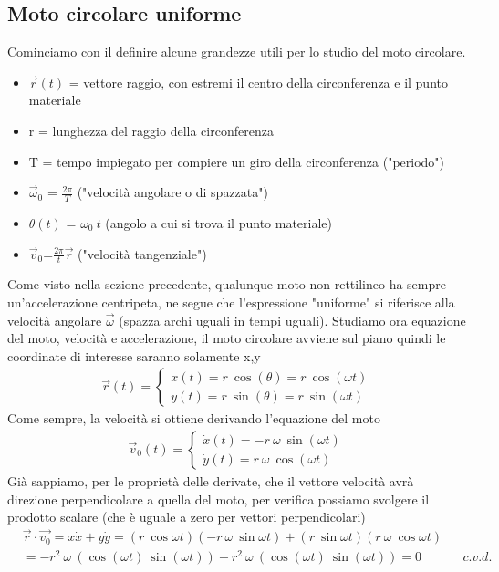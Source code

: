 \subsection{Moto circolare uniforme}
Cominciamo con il definire alcune grandezze utili per lo studio del moto circolare.
\begin{itemize}
\item $\vec{r}(t)$ = vettore raggio, con estremi il centro della circonferenza e il punto materiale
\item r = lunghezza del raggio della circonferenza
\item T = tempo impiegato per compiere un giro della circonferenza ("periodo")
\item $\vec{\omega}_0$ = $\frac{2\pi}{T}$   ("velocità angolare o di spazzata")
\item $\theta(t)$ = $\omega_0\ t$ (angolo a cui si trova il punto materiale)
\item $\vec{v}_0$=$\frac{2\pi}{t} \vec{r}$ ("velocità tangenziale")
\end{itemize}
Come visto nella sezione precedente, qualunque moto non rettilineo ha sempre un'accelerazione centripeta, ne segue che l'espressione "uniforme" si riferisce alla velocità angolare $\vec{\omega}$ (spazza archi uguali in tempi uguali). Studiamo ora equazione del moto, velocità e accelerazione, il moto circolare avviene sul piano quindi le coordinate di interesse saranno solamente x,y
\begin{align*}
\vec{r}(t)=
\begin{cases}
x(t)= r\ \cos (\theta) = r\ \cos (\omega t)\\
y(t)= r\ \sin (\theta) = r\ \sin (\omega t)
\end{cases} 
\end{align*}
Come sempre, la velocità si ottiene derivando l'equazione del moto
\begin{align*}
	\vec{v}_0(t)=
	\begin{cases}
		\dot{x}(t)= -r\ \omega\ \sin (\omega t)\\
		\dot{y}(t)= r\ \omega\ \cos (\omega t)
	\end{cases} 
\end{align*}
Già sappiamo, per le proprietà delle derivate, che il vettore velocità avrà direzione perpendicolare a quella del moto, per verifica possiamo svolgere il prodotto scalare (che è uguale a zero per vettori perpendicolari)
\begin{align*}
	&\vec{r} \cdot \vec{v_0} = x \dot{x} + y \dot{y} = (r\ \cos \omega t) (-r\ \omega\ \sin \omega t) + (r\ \sin \omega t) (r\ \omega\ \cos \omega t)\\
	&= -r^2\ \omega\ (\cos (\omega t)\ \sin( \omega t)) + r^2\ \omega\ (\cos (\omega t)\ \sin( \omega t)) = 0 &&c.v.d.
\end{align*}
